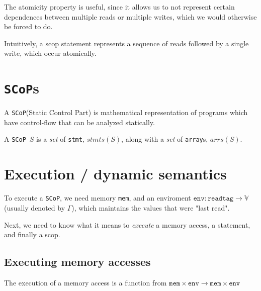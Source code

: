 \documentclass{article}
\newcommand{\val}{\mathbb{V}}
\newcommand{\mem}{\texttt{mem}}
\newcommand{\scop}{\texttt{SCoP}}
\newcommand{\scops}{\scop s}
\newcommand{\readtag}{\texttt{readtag}}
\newcommand{\stmt}{\texttt{stmt}}
\newcommand{\arr}{\texttt{array}}
\newcommand{\env}{\texttt{env}}
\begin{document}
The atomicity property is useful, since it allows us to not represent certain
dependences between multiple reads or multiple writes, which we would
otherwise be forced to do.

Intuitively, a scop statement represents a sequence of reads followed by
a single write, which occur atomically.

\section{\scops}
A \scop (Static Control Part) is mathematical representation of programs
which have control-flow that can be analyzed statically.

A \scop~$S$ is a \textit{set} of \stmt, $stmts(S)$, along with a \textit{set}
of \arr s, $arrs(S)$.


\section{Execution / dynamic semantics}
To execute a \scop, we need memory \mem, and an enviroment $\env : \readtag \to \val$ (usually denoted by $\Gamma$),
which maintains the values that were "last read".

Next, we need to know what it means to \textit{execute} a memory access,
a statement, and finally a scop.

\subsection{Executing memory accesses}
The execution of a memory access is a function from $\mem \times \env \to \mem \times \env$
\end{document}
